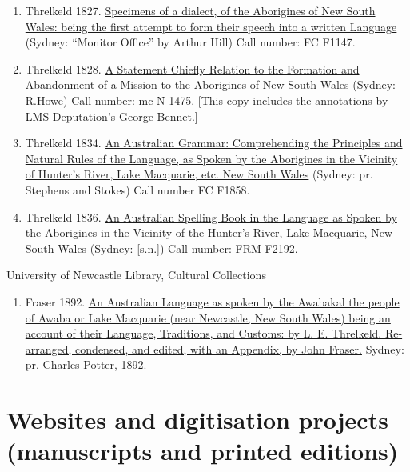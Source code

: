 \begin{enumerate}
    \item Threlkeld 1827. \href{https://nla.gov.au/nla.obj-1711000/view}{Specimens of a dialect, of the Aborigines of New South Wales: being the first attempt to form their speech into a written Language} (Sydney: “Monitor Office” by Arthur Hill) Call number: FC F1147.
    \item Threlkeld 1828. \href{http://nla.gov.au/nla.obj-41049134/view?partId=nla.obj-41049142}{A Statement Chiefly Relation to the Formation and Abandonment of a Mission to the Aborigines of New South Wales} (Sydney: R.Howe) Call number: mc N 1475. [This copy includes the annotations by LMS Deputation’s George Bennet.]
    \item Threlkeld 1834. \href{https://nla.gov.au/nla.obj-115132947/view?partId=nla.obj-484920396}{An Australian Grammar: Comprehending the Principles and Natural Rules of the Language, as Spoken by the Aborigines in the Vicinity of Hunter’s River, Lake Macquarie, etc. New South Wales} (Sydney: pr. Stephens and Stokes) Call number FC F1858.
    \item Threlkeld 1836. \href{https://nla.gov.au/nla.obj-52763467/view?partId=nla.obj-88016030}{An Australian Spelling Book in the Language as Spoken by the Aborigines in the Vicinity of the Hunter’s River, Lake Macquarie, New South Wales} (Sydney: [s.n.]) Call number: FRM F2192.
\end{enumerate}

\noindent University of Newcastle Library, Cultural Collections

\begin{enumerate}
    \item Fraser 1892. \href{https://downloads.newcastle.edu.au/library/cultural%20collections/pdf/al1892whole.pdf}{An Australian Language as spoken by the Awabakal the people of Awaba or Lake Macquarie (near Newcastle, New South Wales) being an account of their Language, Traditions, and Customs: by L. E. Threlkeld. Re-arranged, condensed, and edited, with an Appendix, by John Fraser.} Sydney: pr. Charles Potter, 1892.
\end{enumerate}

\section*{Websites and digitisation projects (manuscripts and printed editions)}

